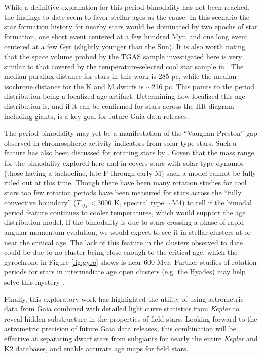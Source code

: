 \documentclass[manuscript, letterpaper]{aastex6}
\newcommand{\Kepler}{\textsl{Kepler}\xspace}
\begin{document}
While a definitive explanation for this period bimodality has not been reached, the findings to date seem to favor stellar ages as the cause. In this scenario the star formation history for nearby stars would be dominated by two epochs of star formation, one short event centered at a few hundred Myr, and one long event centered at a few Gyr (slightly younger than the Sun). It is also worth noting that the space volume probed by the TGAS sample investigated here is very similar to that covered by the temperature-selected cool star sample in \citet{mcquillan2013}. The median parallax distance for stars in this work is 285 pc, while the median isochrone distance for the K and M dwarfs is $\sim$216 pc. This points to the period distribution being a localized age artifact. 
Determining how localized this age distribution is, and if it can be confirmed for stars across the HR diagram including giants, is a key goal for future Gaia data releases.


The period bimodality may yet be a manifestation of the ``Vaughan-Preston'' gap observed in chromospheric activity indicators from solar type stars. Such a feature has also been discussed for rotating stars by \citet{kado-fong2016}. Given that the mass range for the bimodality explored here and in \citet{mcquillan2014} covers stars with solar-type dynamos (those having a tachocline, late F through early M) such a model cannot be fully ruled out at this time. Though there have been many rotation studies for cool stars \citep[e.g.][]{irwin2011,newton2016,stelzer2016} too few rotation periods have been measured for stars across the ``fully convective boundary'' ($T_{eff}<3000$ K, spectral type $\sim$M4) to tell if the bimodal period feature continues to cooler temperatures, which would support the age distribution model. 
If the bimodality is due to stars crossing a phase of rapid angular momentum evolution, we would expect to see it in stellar clusters at or near the critical age. The lack of this feature in the clusters observed to date could be due to no cluster being close enough to the critical age, which the gyrochrone in Figure \ref{fig:gyro} shows is near 600 Myr. Further studies of rotation periods for stars in intermediate age open clusters (e.g. the Hyades) may help solve this mystery \citep[e.g.][]{douglas2014}.

Finally, this exploratory work has highlighted the utility of using astrometric data from Gaia combined with detailed light curve statistics from \Kepler to reveal hidden substructure in the properties of field stars. Looking forward to the astrometric precision of future Gaia data releases, this combination will be effective at separating dwarf stars from subgiants for nearly the entire \Kepler and K2 databases, and enable accurate age maps for field stars.
\end{document}
